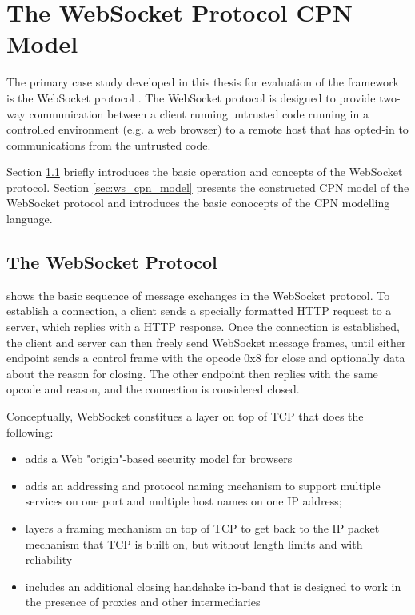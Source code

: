 \chapter{The WebSocket Protocol CPN Model}
\label{chap:background}

The primary case study developed in this thesis for evaluation of the \thename{}
framework is the WebSocket protocol \cite{draft-ietf-hybi-thewebsocketprotocol}.
The WebSocket protocol is designed to provide two-way communication between a client running untrusted
code running in a controlled environment (e.g. a web browser) to a remote host
that has opted-in to communications from the untrusted code.

Section \ref{sec:ws} briefly introduces the basic operation and concepts of the
WebSocket protocol. Section \ref{sec:ws_cpn_model} presents the constructed CPN
model of the WebSocket protocol and introduces the basic conocepts of the CPN
modelling language.

\section{The WebSocket Protocol}\label{sec:ws}

 shows the basic sequence of message exchanges in the
WebSocket protocol.
To establish a connection, a client sends a specially formatted HTTP request to a
server, which replies with a HTTP response. Once the connection is
established, the client and server can then freely send WebSocket message
frames, until either endpoint sends a control frame with the opcode 0x8 for
close and optionally data about the reason for closing. The other endpoint then
replies with the same opcode and reason, and the connection is considered
closed.

Conceptually, WebSocket constitues a layer on top of TCP that
does the following:
\begin{itemize}
	\item adds a Web "origin"-based security model for browsers

	\item adds an addressing and protocol naming mechanism to support
	multiple services on one port and multiple host names on one IP
	address;

	\item layers a framing mechanism on top of TCP to get back to the IP
	packet mechanism that TCP is built on, but without length limits and with
	reliability

	\item includes an additional closing handshake in-band that is designed
	to work in the presence of proxies and other intermediaries
\end{itemize}

